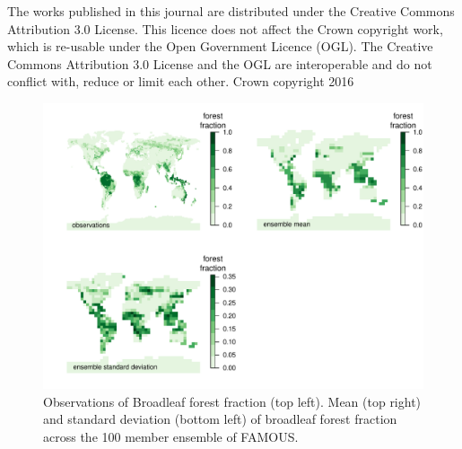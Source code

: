 \documentclass[esd, manuscript]{copernicus}
\begin{document}
The works published in this journal are distributed under the Creative Commons Attribution 3.0 License. This licence does not affect the Crown copyright work, which is re-usable under the Open Government Licence (OGL). The Creative Commons Attribution 3.0 License and the OGL are interoperable and do not conflict with, reduce or limit each other. 
\textcopyright Crown copyright 2016















\begin{figure}[t]
\includegraphics[width=12cm]{graphics/BL_obs_ensemble_mean_sd.pdf}
\caption{Observations of Broadleaf forest fraction (top left). Mean (top right) and standard deviation (bottom left) of broadleaf forest fraction across the 100 member ensemble of FAMOUS.}
\label{fig:BL_obs_ensemble_mean_sd}
\end{figure}
\end{document}
